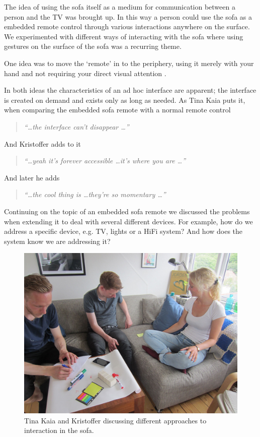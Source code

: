 
The idea of using the sofa itself as a medium for communication between a person and the TV was brought up.
In this way a person could use the sofa as a embedded remote control through various interactions anywhere on the surface.
We experimented with different ways of interacting with the sofa where using gestures on the surface of the sofa was a recurring theme.

One idea was to move the `remote' in to the periphery, using it merely with your hand and not requiring your direct visual attention .


In both ideas the characteristics of an ad hoc interface are apparent; the interface is created on demand and exists only as long as needed.
As Tina Kaia puts it, when comparing the embedded sofa remote with a normal remote control

\begin{quotation}
  \emph{``\dots the interface can't disappear \dots''}
\end{quotation}
And Kristoffer adds to it
\begin{quotation}
  \emph{``\dots yeah it's forever accessible \dots it's where you are \dots''}
\end{quotation}
And later he adds
\begin{quotation}
  \emph{``\dots the cool thing is \dots they're so momentary \dots''}
\end{quotation}

Continuing on the topic of an embedded sofa remote we discussed the problems when extending it to deal with several different devices.
For example, how do we address a specific device, e.g. TV, lights or a HiFi system? And how does the system know we are addressing it?
\blank

\begin{figure}[h]
  \centering
  \includegraphics[width=.9\textwidth]{figures/kaia_moos2}
  \caption{Tina Kaia and Kristoffer discussing different approaches to interaction in the sofa.}
   \label{kaia_moos2}
\end{figure}

